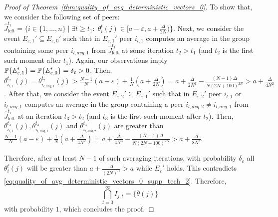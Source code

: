 \begin{proof}[Proof of Theorem~\ref{thm:quality_of_avg_deterministic_vectors_0}]
    To show that, we consider the following set of peers: $\widehat{J}_{\text{left}}^{t_1} = \{i\in\{1,\ldots,n\}\mid \exists t \ge t_1:\; \theta_i^{t}(j)\in [a-\varepsilon, a+\frac{\Delta}{2N})\}$. Next, we consider the event $E_{\varepsilon,1}'\subseteq E_{\varepsilon,0}'$ such that in $E_{\varepsilon,1}'$ peer $i_{l,1}$ computes an average in the group containing some peer $i_{l,avg,1}$ from $\widehat{J}_{\text{left}}^{t_1}$ at some iteration $t_2 > t_1$ (and $t_2$ is the first such moment after $t_1$). Again, our observations imply $\mathbb{P}\{E_{\varepsilon,1}'\} = \mathbb{P}\{E_{\varepsilon,0}'\} = \delta_{\varepsilon}>0$. Then, $\theta_{i_{l,1}}^{t_2}(j) = \theta_{i_{l,avg,1}}^{t_2}(j) > \frac{N-1}{N}(a-\varepsilon) + \frac{1}{N}\left(a+\frac{\Delta}{2N}\right) = a + \frac{\Delta}{2N^2} - \frac{(N-1)\Delta}{N(2N+100)^{2N}} > a + \frac{\Delta}{4N^2}$. After that, we consider the event $E_{\varepsilon,2}'\subseteq E_{\varepsilon,1}'$ such that in $E_{\varepsilon,2}'$ peer $i_{l,1}$ or $i_{l,avg,1}$ computes an average in the group containing a peer $i_{l,avg,2}\neq i_{l,avg,1}$ from $\widehat{J}_{\text{left}}^{t_1}$ at an iteration $t_3 > t_2$ (and $t_3$ is the first such moment after $t_2$). Then, $\theta_{i_{l,1}}^{t_3}(j), \theta_{i_{l,avg,1}}^{t_3}(j)$ and $\theta_{i_{l,avg,2}}^{t_3}(j)$ are greater than $\frac{N-1}{N}(a-\varepsilon) + \frac{1}{N}\left(a + \frac{\Delta}{4N^2}\right) = a + \frac{\Delta}{4N^3} - \frac{(N-1)\Delta}{N(2N+100)^{2N}} > a + \frac{\Delta}{8N^3}$.
    
    Therefore, after at least $N-1$ of such averaging iterations, with probability $\delta_\varepsilon$ all $\theta_i^t(j)$ will be greater than $a + \frac{\Delta}{(2N)^N} > a$ while $E_{\varepsilon}'$ holds. This contradicts \eqref{eq:quality_of_avg_deterministic_vectors_0_supp_tech_2}. Therefore, 
    \begin{equation*}
        \bigcap\limits_{t=0}^\infty I_{j,t} = \{\overline{\theta}(j)\}
    \end{equation*}
    with probability $1$, which concludes the proof.
\end{proof}


